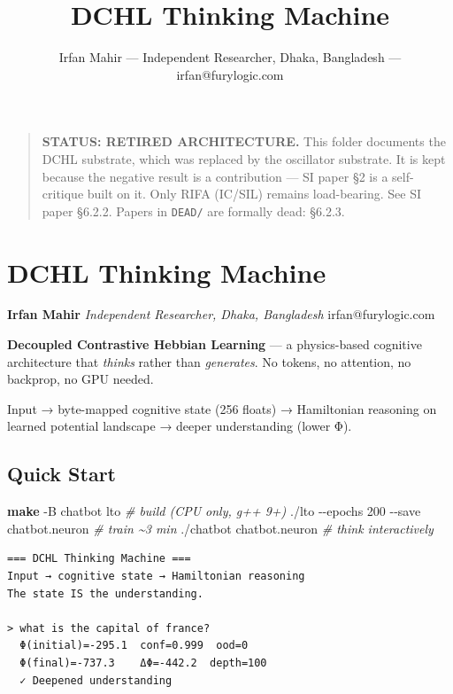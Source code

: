 \documentclass[
  11pt,
  a4paper,
]{article}
\title{DCHL Thinking Machine}
\author{Irfan Mahir --- Independent Researcher, Dhaka, Bangladesh ---
irfan@furylogic.com}
\date{}
\newenvironment{Shaded}{\begin{snugshade}}{\end{snugshade}}
\newcommand{\AttributeTok}[1]{\textcolor[rgb]{0.13,0.29,0.53}{#1}}
\newcommand{\CommentTok}[1]{\textcolor[rgb]{0.56,0.35,0.01}{\textit{#1}}}
\newcommand{\ExtensionTok}[1]{#1}
\newcommand{\FunctionTok}[1]{\textcolor[rgb]{0.13,0.29,0.53}{\textbf{#1}}}
\newcommand{\NormalTok}[1]{#1}
\begin{document}
\maketitle

{
\hypersetup{linkcolor=}
\setcounter{tocdepth}{3}
\tableofcontents
}
\begin{quote}
\textbf{STATUS: RETIRED ARCHITECTURE.} This folder documents the DCHL
substrate, which was replaced by the oscillator substrate. It is kept
because the negative result is a contribution --- SI paper §2 is a
self-critique built on it. Only RIFA (IC/SIL) remains load-bearing. See
SI paper §6.2.2. Papers in \texttt{DEAD/} are formally dead: §6.2.3.
\end{quote}

\section{DCHL Thinking Machine}\label{dchl-thinking-machine}

\textbf{Irfan Mahir} \emph{Independent Researcher, Dhaka, Bangladesh}
irfan@furylogic.com

\textbf{Decoupled Contrastive Hebbian Learning} --- a physics-based
cognitive architecture that \emph{thinks} rather than \emph{generates}.
No tokens, no attention, no backprop, no GPU needed.

Input → byte-mapped cognitive state (256 floats) → Hamiltonian reasoning
on learned potential landscape → deeper understanding (lower Φ).

\subsection{Quick Start}\label{quick-start}

\begin{Shaded}
\begin{Highlighting}[]
\FunctionTok{make} \AttributeTok{{-}B}\NormalTok{ chatbot lto      }\CommentTok{\# build (CPU only, g++ 9+)}
\ExtensionTok{./lto} \AttributeTok{{-}{-}epochs}\NormalTok{ 200 }\AttributeTok{{-}{-}save}\NormalTok{ chatbot.neuron  }\CommentTok{\# train \textasciitilde{}3 min}
\ExtensionTok{./chatbot}\NormalTok{ chatbot.neuron                    }\CommentTok{\# think interactively}
\end{Highlighting}
\end{Shaded}

\begin{verbatim}
=== DCHL Thinking Machine ===
Input → cognitive state → Hamiltonian reasoning
The state IS the understanding.

> what is the capital of france?
  Φ(initial)=-295.1  conf=0.999  ood=0
  Φ(final)=-737.3    ΔΦ=-442.2  depth=100
  ✓ Deepened understanding
\end{verbatim}
\end{document}
